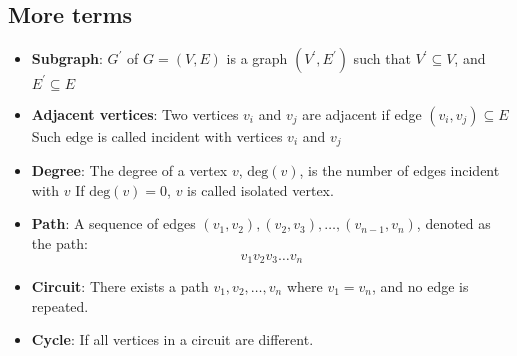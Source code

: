 \documentclass{report}
\begin{document}
\bigbreak \noindent 
\subsection{More terms}
\bigbreak \noindent 
\begin{itemize}
    \item \textbf{Subgraph}: $G^{\prime}$ of $G=(V,E)$ is a graph $(V^{\prime},E^{\prime})$ such that $V^{\prime}  \subseteq V$, and $E^{\prime} \subseteq E $
    \item \textbf{Adjacent vertices}: Two vertices $v_{i}$ and $v_{j}$ are adjacent if edge $(v_{i}, v_{j})  \subseteq E$
        \bigbreak \noindent 
        Such edge is called incident with vertices $v_{i}$ and $v_{j}$
    \item \textbf{Degree}: The degree of a vertex $v$, $\text{deg}(v)$, is the number of edges incident with $v$
        \bigbreak \noindent 
        If $\text{deg}(v) = 0$, $v$ is called isolated vertex.
    \item \textbf{Path}: A sequence of edges \((v_1, v_2), (v_2, v_3), \dots, (v_{n-1}, v_n)\), denoted as the path:
        \[
            v_1 v_2 v_3 \dots v_n
        \]
    \item \textbf{Circuit}: There exists a path \(v_1, v_2, \dots, v_n\) where \(v_1 = v_n\), and no edge is repeated.
    \item \textbf{Cycle}: If all vertices in a circuit are different.
\end{itemize}

\bigbreak \noindent 
\end{document}
